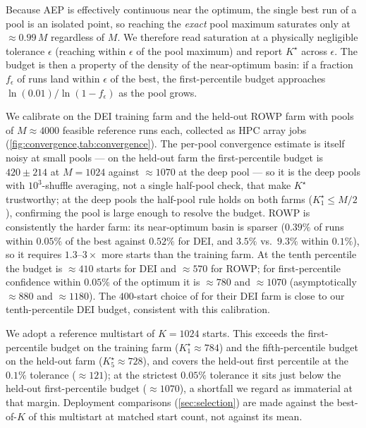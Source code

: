 \documentclass[11pt]{article}
\begin{document}
Because AEP is effectively continuous near the optimum, the single best run of a pool is
an isolated point, so reaching the \emph{exact} pool maximum saturates only at
$\approx0.99\,M$ regardless of $M$. We therefore read saturation at a physically
negligible tolerance $\epsilon$ (reaching within $\epsilon$ of the pool maximum) and
report $K^\star$ across $\epsilon$. The budget is then a property of the density of the
near-optimum basin: if a fraction $f_\epsilon$ of runs land within $\epsilon$ of the
best, the first-percentile budget approaches $\ln(0.01)/\ln(1-f_\epsilon)$ as the pool
grows.

We calibrate on the DEI training farm and the held-out ROWP farm with pools of
$M\!\approx\!4000$ feasible reference runs each, collected as HPC array jobs
(\cref{fig:convergence,tab:convergence}). The per-pool convergence estimate is itself
noisy at small pools --- on the held-out farm the first-percentile budget is
$420\pm214$ at $M=1024$ against $\approx\!1070$ at the deep pool --- so it is the deep
pools with $10^3$-shuffle averaging, not a single half-pool check, that make $K^\star$
trustworthy; at the deep pools the half-pool rule holds on both farms
($K^\star_1\le M/2$), confirming the pool is large enough to resolve the budget. ROWP is
consistently the harder farm: its near-optimum basin is sparser ($0.39\%$ of runs within
$0.05\%$ of the best against $0.52\%$ for DEI, and $3.5\%$ vs.\ $9.3\%$ within $0.1\%$),
so it requires $1.3$--$3\times$ more starts than the training farm. At the tenth
percentile the budget is $\approx\!410$ starts for DEI and $\approx\!570$ for ROWP; for
first-percentile confidence within $0.05\%$ of the optimum it is $\approx\!780$ and
$\approx\!1070$ (asymptotically $\approx\!880$ and $\approx\!1180$). The $400$-start
choice of \citet{quick2026neighbors} for their DEI farm is close to our tenth-percentile
DEI budget, consistent with this calibration.

We adopt a reference multistart of $K=1024$ starts. This exceeds the first-percentile
budget on the training farm ($K^\star_1\approx784$) and the fifth-percentile budget on
the held-out farm ($K^\star_5\approx728$), and covers the held-out first percentile at
the $0.1\%$ tolerance ($\approx\!121$); at the strictest $0.05\%$ tolerance it sits just
below the held-out first-percentile budget ($\approx\!1070$), a shortfall we regard as
immaterial at that margin. Deployment comparisons (\cref{sec:selection}) are made against the
best-of-$K$ of this multistart at matched start count, not against its mean.
\end{document}
